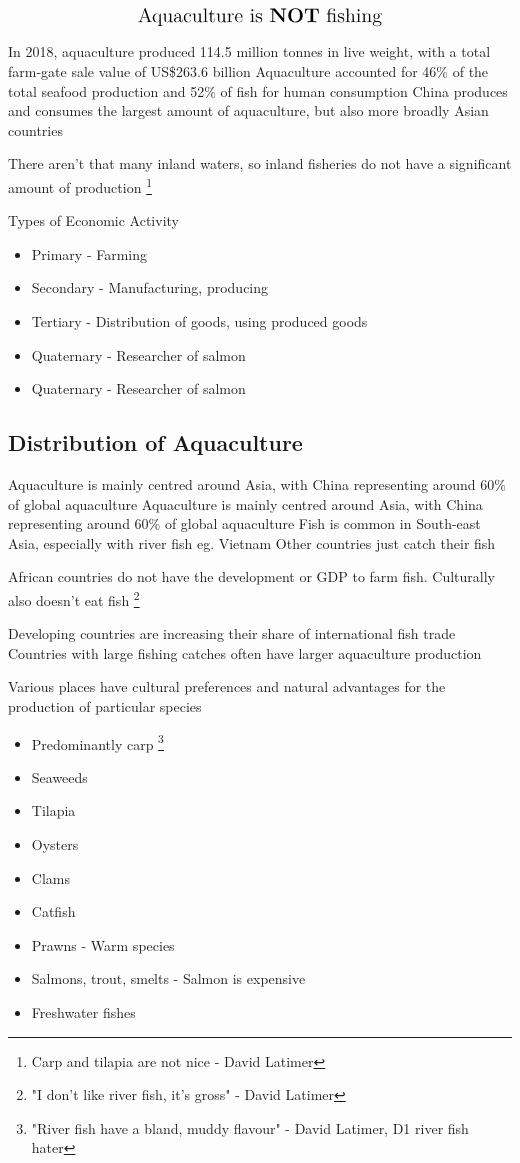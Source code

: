 	\begin{align*}
		\text{\Large Aquaculture is \textbf{NOT} fishing}
	\end{align*}

	 In 2018, aquaculture produced 114.5 million tonnes in live weight, with a total farm-gate sale value of US\$263.6 billion
	Aquaculture accounted for 46\% of the total seafood production and 52\% of fish for human consumption
	China produces and consumes the largest amount of aquaculture, but also more broadly Asian countries

	There aren't that many inland waters, so inland fisheries do not have a significant amount of production \footnote{Carp and tilapia are not nice - David Latimer}

	Types of Economic Activity
	\begin{itemize}
		\item Primary - Farming
		\item Secondary - Manufacturing, producing
		\item Tertiary - Distribution of goods, using produced goods
		\item Quaternary - Researcher of salmon
		\item Quaternary - Researcher of salmon
	\end{itemize}

	\subsection{Distribution of Aquaculture}
		Aquaculture is mainly centred around Asia, with China representing around 60\% of global aquaculture
		Aquaculture is mainly centred around Asia, with China representing around 60\% of global aquaculture
		Fish is common in South-east Asia, especially with river fish eg. Vietnam
		Other countries just catch their fish

		African countries do not have the development or GDP to farm fish. Culturally also doesn't eat fish
		\footnote{"I don't like river fish, it's gross" - David Latimer}

		Developing countries are increasing their share of international fish trade
		Countries with large fishing catches often have larger aquaculture production
		
		Various places have cultural preferences and natural advantages for the production of particular species
		\begin{itemize}
			\item Predominantly carp \footnote{"River fish have a bland, muddy flavour" - David Latimer, D1 river fish hater}
			\item Seaweeds
			\item Tilapia
			\item Oysters
			\item Clams
			\item Catfish
			\item Prawns - Warm species
			\item Salmons, trout, smelts - Salmon is expensive
			\item Freshwater fishes
		\end{itemize}

